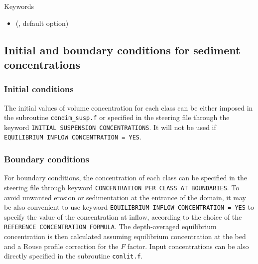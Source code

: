 \medskip
\begin{bclogo}[couleur=blue!10,arrondi=0.1, logo=\bcinfo]{Keywords}
\begin{itemize}
\item {} (, default option)
\end{itemize}
\end{bclogo}


\subsection{Initial and boundary conditions for sediment concentrations}

\subsubsection{Initial conditions}

The initial values of volume concentration for each class can be either imposed
in the subroutine \texttt{condim\_susp.f} or specified in the steering file through the keyword
\texttt{INITIAL SUSPENSION CONCENTRATIONS}. It will not be used if \texttt{EQUILIBRIUM INFLOW CONCENTRATION = YES}.

\subsubsection{Boundary conditions}
For boundary conditions, the concentration of each class can be
specified in the steering file through keyword \texttt{CONCENTRATION PER CLASS AT BOUNDARIES}. 
To avoid unwanted erosion or sedimentation at the entrance of the domain, it may be also convenient to use keyword \texttt{EQUILIBRIUM INFLOW CONCENTRATION = YES} to specify the value of the concentration at inflow, according to the choice of the \texttt{REFERENCE CONCENTRATION FORMULA}. The depth-averaged equilibrium concentration is then calculated assuming equilibrium concentration at the bed and a Rouse profile correction for the $F$ factor. 
Input concentrations can be also directly specified in the subroutine \texttt{conlit.f}.


